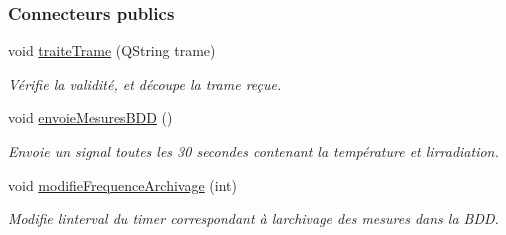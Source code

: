 \subsubsection*{Connecteurs publics}
\begin{DoxyCompactItemize}
\item 
void \hyperlink{class_mesures_a43b121b67418802b3332b195d8541481}{traite\+Trame} (Q\+String trame)
\begin{DoxyCompactList}\small\item\em Vérifie la validité, et découpe la trame reçue. \end{DoxyCompactList}\item 
void \hyperlink{class_mesures_a9eb8d49c9f60b3801110a5c3d0c50149}{envoie\+Mesures\+B\+DD} ()
\begin{DoxyCompactList}\small\item\em Envoie un signal toutes les 30 secondes contenant la température et l\textquotesingle{}irradiation. \end{DoxyCompactList}\item 
void \hyperlink{class_mesures_ac1d2ea97f648264ebd690fba8f7020cc}{modifie\+Frequence\+Archivage} (int)
\begin{DoxyCompactList}\small\item\em Modifie l\textquotesingle{}interval du timer correspondant à l\textquotesingle{}archivage des mesures dans la B\+DD. \end{DoxyCompactList}\end{DoxyCompactItemize}
